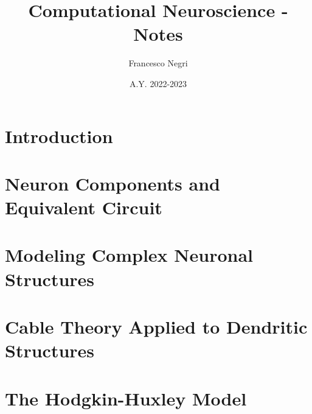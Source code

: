\documentclass[12pt]{article}
\title{Computational Neuroscience - Notes}
\author{Francesco Negri}
\date{A.Y. 2022-2023}
\begin{document}
\maketitle

\tableofcontents
\newpage

\section{Introduction}
\graphicspath{ {./images/01/} }

\newpage

\section{Neuron Components and Equivalent Circuit}
\graphicspath{ {./images/02/} }

\newpage

\section{Modeling Complex Neuronal Structures}
\graphicspath{ {./images/03/} }

\newpage

\section{Cable Theory Applied to Dendritic Structures}
\graphicspath{ {./images/04/} }

\newpage

\section{The Hodgkin-Huxley Model}
\graphicspath{ {./images/05/} }

\newpage
\end{document}
